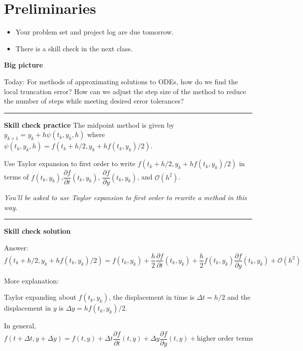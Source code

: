 \documentclass[12pt,letterpaper,noanswers]{exam}
\begin{document}
 \pdfpageheight 11in 
  \pdfpagewidth 8.5in

\noindent 

\section*{Preliminaries}

\begin{itemize}
\itemsep0pt
\item Your problem set and project log are due tomorrow.
\item There is a skill check in the next class.
\end{itemize}


\noindent\textbf{Big picture}

Today: For methods of approximating solutions to ODEs, how do we find the local truncation error?  How can we adjust the step size of the method to reduce the number of steps while meeting desired error tolerances?

\vspace{0.2cm}
\hrule
\vspace{0.2cm}

\noindent \textbf{Skill check practice}
 The midpoint method is given by $y_{k+1} = y_k + h\psi(t_k,y_k,h)$ where $\psi(t_k,y_k,h) = f(t_k+h/2,y_k+hf(t_k,y_k)/2)$.

Use Taylor expansion to first order to write $f(t_k+h/2,y_k+hf(t_k,y_k)/2)$ in terms of $f(t_k, y_k)$,$\dfrac{\partial f}{\partial t}(t_k,y_k)$, $\dfrac{\partial f}{\partial y}(t_k,y_k)$, and $\mathcal{O}(h^2)$.

\emph{You'll be asked to use Taylor expansion to first order to rewrite a method in this way.}


\vspace{0.2cm}
\hrule
\vspace{0.2cm}

\noindent \textbf{Skill check solution}

Answer: $f(t_k+h/2,y_k+hf(t_k,y_k)/2) = f(t_k,y_k) + \dfrac{h}{2} \dfrac{\partial f}{\partial t}(t_k,y_k) + \dfrac{h}{2}f(t_k,y_k) \dfrac{\partial f}{\partial y}(t_k,y_k) + \mathcal{O}(h^2)$


More explanation:

Taylor expanding about $f(t_k, y_k)$, the displacement in time is $\Delta t = h/2$ and the displacement in $y$ is $\Delta y = hf(t_k,y_k)/2$.

In general, $f(t+\Delta t, y+\Delta y) = f(t,y) + \Delta t \dfrac{\partial f}{\partial t}(t,y) +  \Delta y \dfrac{\partial f}{\partial y}(t,y) + \text{higher order terms}$
\end{document}
